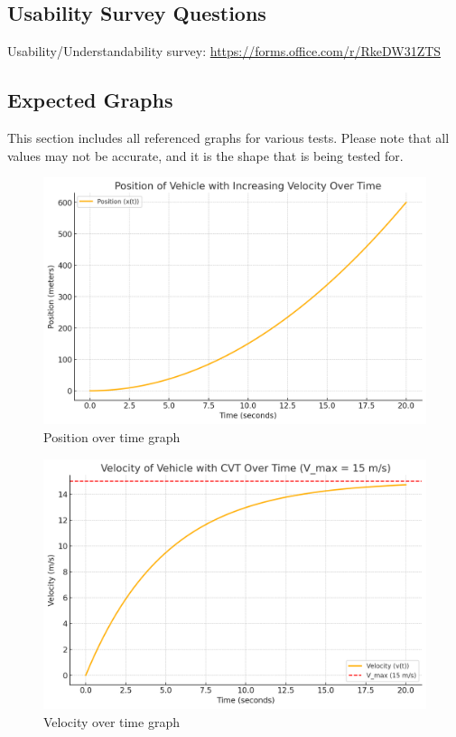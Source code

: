 \documentclass[12pt, titlepage]{article}
\begin{document}
\subsection{Usability Survey Questions} \label{sec:Usability Survey Questions}

Usability/Understandability survey:
\url{https://forms.office.com/r/RkeDW31ZTS}

\subsection{Expected Graphs}
This section includes all referenced graphs for various tests. Please note that all values may not be accurate, and it is the shape that is being tested for.

\begin{figure}[H]
  \centering
  \includegraphics[width=\textwidth]{graphs/position.png}
  \caption{Position over time graph}
  \label{fig:position_graph}
\end{figure}

\begin{figure}[H]
  \centering
  \includegraphics[width=\textwidth]{graphs/velocity.png}
  \caption{Velocity over time graph}
  \label{fig:velocity_graph}
\end{figure}
\end{document}
